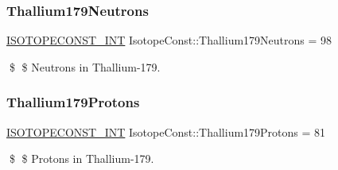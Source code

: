 \subsubsection{\texorpdfstring{Thallium179\+Neutrons}{Thallium179Neutrons}}
{\footnotesize\ttfamily \mbox{\hyperlink{group___isotope_const-_macros_ga5f18360b3e99483a35c32d789e62621c}{I\+S\+O\+T\+O\+P\+E\+C\+O\+N\+S\+T\+\_\+\+I\+NT}} Isotope\+Const\+::\+Thallium179\+Neutrons = 98}

\$ \$ Neutrons in Thallium-\/179. \mbox{\label{group___isotope_const-_thallium-_tl179_gabea54a17ca2a154fb2816f927e9bf65f}} 
\subsubsection{\texorpdfstring{Thallium179\+Protons}{Thallium179Protons}}
{\footnotesize\ttfamily \mbox{\hyperlink{group___isotope_const-_macros_ga5f18360b3e99483a35c32d789e62621c}{I\+S\+O\+T\+O\+P\+E\+C\+O\+N\+S\+T\+\_\+\+I\+NT}} Isotope\+Const\+::\+Thallium179\+Protons = 81}

\$ \$ Protons in Thallium-\/179. 